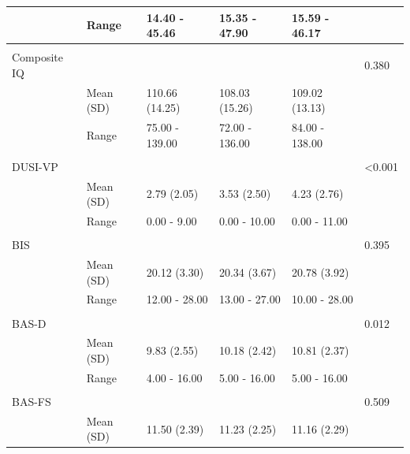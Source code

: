 \documentclass[utf8]{stylesheet}
\begin{document}
\begin{table}[h!]
\begin{tabular}{llllll}
                    & Range           & 14.40 - 45.46  & 15.35 - 47.90  & 15.59 - 46.17  &                          \\ \hline \\
Composite IQ        &                 &                  &                  &                  & 0.380                    \\
                    & Mean (SD)       & 110.66 (14.25) & 108.03 (15.26) & 109.02 (13.13) &                          \\
                    & Range           & 75.00 - 139.00 & 72.00 - 136.00 & 84.00 - 138.00 &                          \\ \hline \\
DUSI-VP    &                 &                  &                  &                  & \textless 0.001 \\
                    & Mean (SD)       & 2.79 (2.05)    & 3.53 (2.50)    & 4.23 (2.76)    &                          \\
                    & Range           & 0.00 - 9.00    & 0.00 - 10.00   & 0.00 - 11.00   &                          \\ \hline \\
BIS                 &                 &                  &                  &                  & 0.395                    \\
                    & Mean (SD)       & 20.12 (3.30)   & 20.34 (3.67)   & 20.78 (3.92)   &                          \\
                    & Range           & 12.00 - 28.00  & 13.00 - 27.00  & 10.00 - 28.00  &                          \\ \hline \\
BAS-D &                 &                  &                  &                  & 0.012           \\
                    & Mean (SD)       & 9.83 (2.55)    & 10.18 (2.42)   & 10.81 (2.37)   &                          \\
                    & Range           & 4.00 - 16.00   & 5.00 - 16.00   & 5.00 - 16.00   &                          \\ \hline \\
BAS-FS     &                 &                  &                  &                  & 0.509                    \\
                    & Mean (SD)       & 11.50 (2.39)   & 11.23 (2.25)   & 11.16 (2.29)   &                          \\

\end{tabular}
\end{table}
\end{document}
